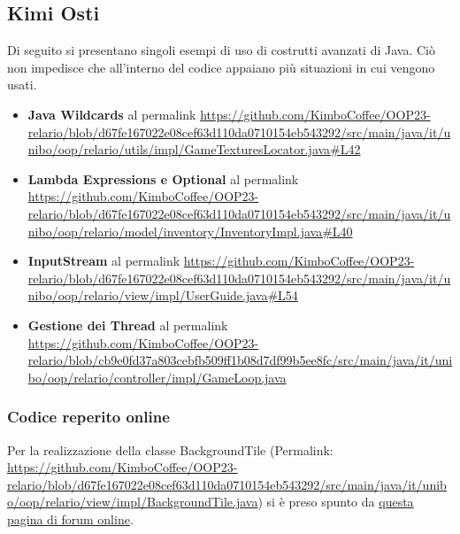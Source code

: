 \documentclass[a4paper,12pt]{report}
\begin{document}
\subsection{Kimi Osti}

Di seguito si presentano singoli esempi di uso di costrutti avanzati di Java. Ciò non impedisce che all'interno del codice appaiano più situazioni in cui vengono usati.
\begin{itemize}
	\item \textbf{Java Wildcards} al permalink \url{https://github.com/KimboCoffee/OOP23-relario/blob/d67fe167022e08cef63d110da0710154eb543292/src/main/java/it/unibo/oop/relario/utils/impl/GameTexturesLocator.java#L42}
	\item \textbf{Lambda Expressions e Optional} al permalink \url{https://github.com/KimboCoffee/OOP23-relario/blob/d67fe167022e08cef63d110da0710154eb543292/src/main/java/it/unibo/oop/relario/model/inventory/InventoryImpl.java#L40}
	\item \textbf{InputStream} al permalink \url{https://github.com/KimboCoffee/OOP23-relario/blob/d67fe167022e08cef63d110da0710154eb543292/src/main/java/it/unibo/oop/relario/view/impl/UserGuide.java#L54}
	\item \textbf{Gestione dei Thread} al permalink \url{https://github.com/KimboCoffee/OOP23-relario/blob/cb9e0fd37a803cebfb509ff1b08d7df99b5ee8fc/src/main/java/it/unibo/oop/relario/controller/impl/GameLoop.java}
\end{itemize}

\subsubsection{Codice reperito online}
Per la realizzazione della classe BackgroundTile (Permalink:  \url{https://github.com/KimboCoffee/OOP23-relario/blob/d67fe167022e08cef63d110da0710154eb543292/src/main/java/it/unibo/oop/relario/view/impl/BackgroundTile.java}) si è preso spunto da \href{https://coderanch.com/t/336043/java/Images-top}{questa pagina di forum online}.
\end{document}
